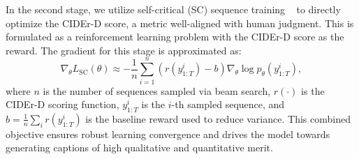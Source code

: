 \documentclass[lettersize,journal]{IEEEtran}
\begin{document}
	In the second stage, we utilize self-critical (SC) sequence training ~\cite{rennie2017self} to directly optimize the CIDEr-D score, a metric well-aligned with human judgment. This is formulated as a reinforcement learning problem with the CIDEr-D score as the reward. The gradient for this stage is approximated as:
	\[
	\nabla_{\theta} L_{\text{SC}}(\theta) \approx -\frac{1}{n} \sum_{i=1}^{n} \left( r(y_{1:T}^{i}) - b \right) \nabla_{\theta} \log p_{\theta}(y_{1:T}^{i}),
	\]
	where \(n\) is the number of sequences sampled via beam search, \(r(\cdot)\) is the CIDEr-D scoring function, \(y_{1:T}^{i}\) is the \(i\)-th sampled sequence, and \(b = \frac{1}{n}\sum_{i} r(y_{1:T}^{i})\) is the baseline reward used to reduce variance. This combined objective ensures robust learning convergence and drives the model towards generating captions of high qualitative and quantitative merit.
	\begin{table}[t]
		\centering
		\caption{VLM scaling on UICO (3500 test images). $S_m$ = mean of B@4, M, R, C, S; $S^*_m$ = mean of B@4, M, R, C (SPICE-excluded).}
		\label{tab:vlm_scaling}
		\small
		\setlength{\tabcolsep}{6pt}
	\end{table}
	
\end{document}
